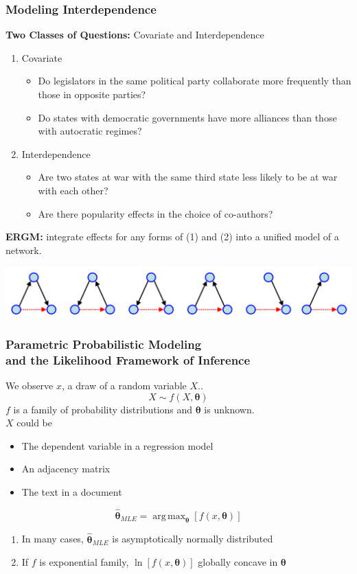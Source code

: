 \documentclass[handout]{beamer}
\newcommand{\bt}{\pmb{\theta}}
\DeclareMathOperator*{\argmax}{arg\,max}
\newenvironment{changemargin}[2]{%
  \begin{list}{}{%
    \setlength{\topsep}{0pt}%
    \setlength{\leftmargin}{#1}%
    \setlength{\rightmargin}{#2}%
    \setlength{\listparindent}{\parindent}%
    \setlength{\itemindent}{\parindent}%
    \setlength{\parsep}{\parskip}%
  }%
  \item[]}{\end{list}}
\begin{document}
\begin{frame}
\frametitle{Modeling Interdependence}

{\bf Two Classes of Questions:} Covariate and Interdependence
\begin{enumerate}
\item Covariate
\begin{itemize}
\item Do legislators in the same political party collaborate more frequently than those in opposite parties?
\item Do states with democratic governments have more alliances than those with autocratic regimes?
\end{itemize}
\item Interdependence
\begin{itemize}
\item Are two states at war with the same third state less likely to be at war with each other?
\item Are there popularity effects in the choice of co-authors?
\end{itemize}
\end{enumerate}
{\bf ERGM:} integrate effects for any forms of (1) and (2) into a unified model of a network.
\begin{center}
\begin{changemargin}{-.5cm}{-1cm}
\includegraphics[scale=.25]{allTriads.jpg}
\end{changemargin}
\end{center}
\end{frame}





\begin{frame}
\frametitle{Parametric Probabilistic Modeling \\ and the Likelihood Framework of Inference}
We observe $x$, a draw of a random variable $X$.. $$ X\sim f(X,\bt)$$
$f$ is a family of probability distributions and $\bt$ is unknown.
\\ $X$ could be
\begin{itemize}
\item The dependent variable in a regression model
\item An adjacency matrix
\item The text in a document
\end{itemize}
$$\hat{\bt}_{MLE} = \argmax_{\bt}\left[f(x,\bt)\right] $$
\begin{enumerate}
\item In many cases, $\hat{\bt}_{MLE}$ is asymptotically normally distributed
\item If $f$ is exponential family, $\ln\left[f(x,\bt)\right]$ globally concave in $\bt$
\end{enumerate}

\end{frame}
\end{document}
